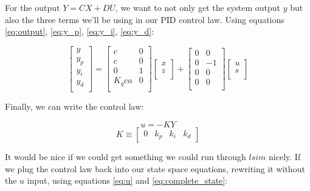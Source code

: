 \documentclass[10pt,letterpaper]{article}
\begin{document}
For the output $Y = CX + DU$, we want to not only get the system output $y$ but also the three terms we'll be using in our PID control law. Using equations \ref{eq:output}, \ref{eq:y_p}, \ref{eq:y_i}, \ref{eq:y_d}:

\begin{equation} \label{eq:complete_output}
\begin{bmatrix}
	y \\
	y_p \\
	y_i \\
	y_d \\
\end{bmatrix} =
\begin{bmatrix}
	c & 0 \\
	c & 0 \\
	0 & 1 \\
	K_g c a & 0 \\
\end{bmatrix}
\begin{bmatrix}
	x \\
	z \\
\end{bmatrix} + 
\begin{bmatrix}
	0 & 0 \\
	0 & -1 \\
	0 & 0 \\
	0 & 0 \\
\end{bmatrix}
\begin{bmatrix}
	u \\
	s \\
\end{bmatrix}
\end{equation}

Finally, we can write the control law:

\[ u = -K Y \]
\[
K \equiv
\begin{bmatrix}
	0 & k_p & k_i & k_d
\end{bmatrix}
\]

It would be nice if we could get something we could run through $lsim$ nicely. If we plug the control law back into our state space equations, rewriting it without the $u$ input, using equations \ref{eq:u} and \ref{eq:complete_state}:
\end{document}
